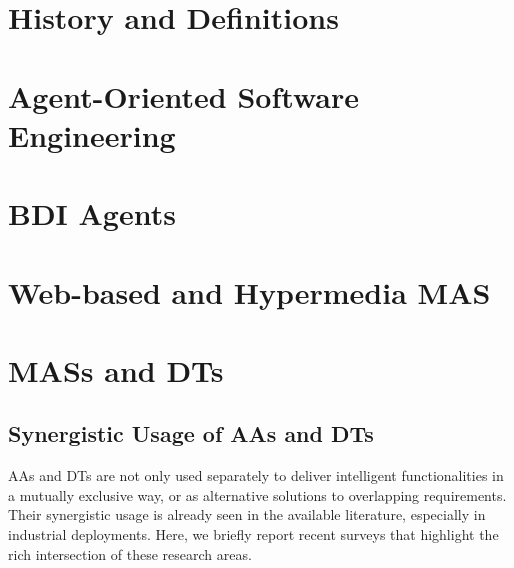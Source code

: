 \section{History and Definitions}





\section{Agent-Oriented Software Engineering}

\section{\acl{BDI} Agents}

\section{Web-based and Hypermedia \acs{MAS}}

\section{\aclp{MAS} and \aclp{DT}}

\subsection{Synergistic Usage of AAs and DTs}
\label{ssec:synergy}


AAs and DTs are not only used separately 
to deliver intelligent functionalities 
in a mutually exclusive way, 
or as alternative solutions to overlapping requirements.
Their synergistic usage is already seen in the available literature, 
especially in industrial deployments. Here, we briefly report recent surveys that highlight the rich intersection of these research areas.

